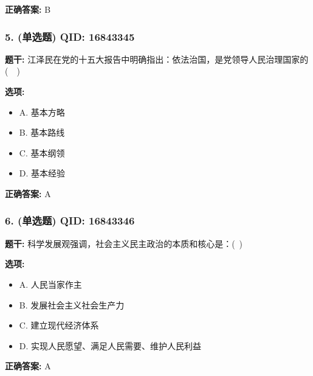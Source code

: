 \documentclass[12pt,UTF8]{ctexart}
\begin{document}
\textbf{正确答案:}
B

\vspace{0.3em}\hrulefill\vspace{0.7em}

\subsubsection*{5. (单选题) \small QID: 16843345}

\textbf{题干:}
江泽民在党的十五大报告中明确指出：依法治国，是党领导人民治理国家的(  )

\textbf{选项:}
\begin{itemize}[leftmargin=*]

  \item A. 基本方略

  \item B. 基本路线

  \item C. 基本纲领

  \item D. 基本经验

\end{itemize}

\textbf{正确答案:}
A

\vspace{0.3em}\hrulefill\vspace{0.7em}

\subsubsection*{6. (单选题) \small QID: 16843346}

\textbf{题干:}
科学发展观强调，社会主义民主政治的本质和核心是：( )

\textbf{选项:}
\begin{itemize}[leftmargin=*]

  \item A. 人民当家作主

  \item B. 发展社会主义社会生产力

  \item C. 建立现代经济体系

  \item D. 实现人民愿望、满足人民需要、维护人民利益

\end{itemize}

\textbf{正确答案:}
A

\vspace{0.3em}\hrulefill\vspace{0.7em}
\end{document}

